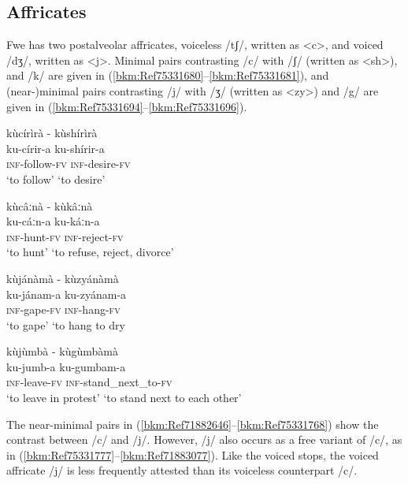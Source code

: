 \subsection{Affricates}

Fwe has two postalveolar affricates, voiceless /tʃ/, written as <c>, and voiced /dʒ/, written as <j>. Minimal pairs contrasting /c/ with /ʃ/ (written as <sh>), and /k/ are given in (\ref{bkm:Ref75331680}--\ref{bkm:Ref75331681}), and (near-)minimal pairs contrasting /j/ with /ʒ/ (written as <zy>) and /g/ are given in (\ref{bkm:Ref75331694}--\ref{bkm:Ref75331696}).

\ea
\label{bkm:Ref75331680}
kùcírìrà                        \tab  - \tab kùshírìrà\\
ku-círir-a                        \tab    \tab   ku-shírir-a\\
\textsc{inf}-follow-\textsc{fv}      \tab \tab  \textsc{inf}-desire-\textsc{fv}\\
‘to follow’                       \tab \tab       ‘to desire’
\z

\ea
\label{bkm:Ref75331681}
kùcâːnà    \tab  - \tab  kùkâːnà\\
ku-cáːn-a     \tab    \tab   ku-káːn-a\\
\textsc{inf}-hunt-\textsc{fv}    \tab    \tab    \textsc{inf}-reject-\textsc{fv}\\
‘to hunt’   \tab    \tab     ‘to refuse, reject, divorce’
\z

\ea
\label{bkm:Ref75331694}
kùjánàmà  \tab  - \tab  kùzyánàmà\\
ku-jánam-a \tab \tab     ku-zyánam-a\\
\textsc{inf}-gape-\textsc{fv} \tab \tab     \textsc{inf}-hang-\textsc{fv}\\
\glt ‘to gape’ \tab \tab     ‘to hang to dry
\z

\ea
\label{bkm:Ref75331696}
kùjùmbà \tab    - \tab kùgùmbàmà\\
ku-jumb-a \tab\tab     ku-gumbam-a\\
\textsc{inf}-leave-\textsc{fv} \tab\tab     \textsc{inf}-stand\_next\_to-\textsc{fv}\\
\glt ‘to leave in protest’  \tab\tab  ‘to stand next to each other’
\z

The near-minimal pairs in (\ref{bkm:Ref71882646}--\ref{bkm:Ref75331768}) show the contrast between /c/ and /j/. However, /j/ also occurs as a free variant of /c/, as in (\ref{bkm:Ref75331777}--\ref{bkm:Ref71883077}). Like the voiced stops, the voiced affricate /j/ is less frequently attested than its voiceless counterpart /c/.

